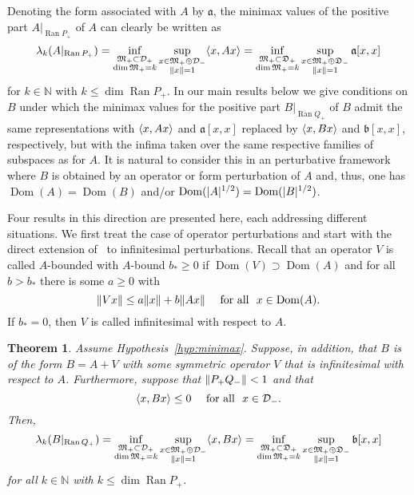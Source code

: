 \documentclass[11pt,a4paper]{amsart}
\numberwithin{equation}{section}
\DeclareMathOperator{\Ran}{Ran}
\DeclareMathOperator{\Dom}{Dom}
\DeclarePairedDelimiter{\abs}{|}{|}
\DeclarePairedDelimiter{\norm}{\lVert}{\rVert}
\DeclarePairedDelimiter{\scprod}{\langle}{\rangle}
\newcommand{\N}{\mathbb{N}}
\newcommand{\NN}{\mathbb{N}}
\newcommand{\cD}{{\mathcal D}}
\newcommand{\fa}{{\mathfrak a}}
\newcommand{\fb}{{\mathfrak b}}
\newcommand{\fD}{{\mathfrak D}}
\newcommand{\fM}{{\mathfrak M}}
\theoremstyle{plain}
\newtheorem{theorem}{Theorem}[section]
\theoremstyle{definition}
\theoremstyle{remark}
\begin{document}
Denoting the form associated with $A$ by $\fa$, the minimax values of the positive part $A|_{\Ran P_+}$ of $A$ can clearly be
written as
\begin{equation*}
  \lambda_k(A|_{\Ran P_+})
  =
  \inf_{\substack{\fM_+\subset\cD_+\\ \dim\fM_+=k}} \sup_{\substack{x\in\fM_+ \oplus \cD_-\\ \norm{x}=1}} \scprod{ x , Ax }
  =
  \inf_{\substack{\fM_+\subset\fD_+\\ \dim\fM_+=k}} \sup_{\substack{x\in\fM_+ \oplus \fD_-\\ \norm{x}=1}} \fa[x,x]
\end{equation*}
for $k\in\N$ with $k \le \dim \Ran P_+$. In our main results below we give conditions on $B$ under which the minimax values for
the positive part $B|_{\Ran Q_+}$ of $B$ admit the same representations with $\scprod{x , Ax }$ and $\fa[x , x]$ replaced by
$\scprod{x , Bx}$ and $\fb[x , x]$, respectively, but with the infima taken over the same respective families of subspaces as for
$A$. It is natural to consider this in an perturbative framework where $B$ is obtained by an operator or form perturbation of $A$
and, thus, one has $\Dom(A) = \Dom(B)$ and/or $\Dom(\abs{A}^{1/2}) = \Dom(\abs{B}^{1/2})$.

Four results in this direction are presented here, each addressing different situations. We first treat the case of operator
perturbations and start with the direct extension of~\cite[Theorem~A.2]{NSTTV18} to infinitesimal perturbations. Recall that an
operator $V$ is called $A$-bounded with $A$-bound $b_* \ge 0$ if $\Dom(V) \supset \Dom(A)$ and for all $b > b_*$ there is some
$a \ge 0$ with
\begin{equation*}
  \norm{ Vx }
  \le
  a\norm{x} + b\norm{Ax}
  \quad\text{ for all }\
  x \in \Dom(A)
  .
\end{equation*}
If $b_* = 0$, then $V$ is called infinitesimal with respect to $A$.

\begin{theorem}\label{thm:genOpInfinitesimal}
  Assume Hypothesis~\ref{hyp:minimax}. Suppose, in addition, that $B$ is of the form $B = A + V$ with some symmetric operator $V$
  that is infinitesimal with respect to $A$. Furthermore, suppose that $\norm{P_+Q_-} < 1$ and that
  \begin{equation*}
    \scprod{ x , Bx } \le 0 \quad\text{ for all }\ x \in \cD_-.
  \end{equation*}
  Then,
  \begin{equation*}
    \lambda_k(B|_{\Ran Q_+})
    =
    \inf_{\substack{\fM_+\subset\cD_+\\ \dim\fM_+=k}} \sup_{\substack{x\in\fM_+ \oplus \cD_-\\ \norm{x}=1}} \scprod{ x , Bx }
    =
    \inf_{\substack{\fM_+\subset\fD_+\\ \dim\fM_+=k}} \sup_{\substack{x\in\fM_+ \oplus \fD_-\\ \norm{x}=1}} \fb[x,x]
  \end{equation*}
  for all $k \in \NN$ with $k \le \dim\Ran P_+$.
\end{theorem}
\end{document}
